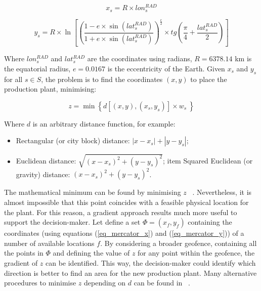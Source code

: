 \begin{equation}
    x_s=R\times lon_s^{RAD}
    \label{eq_mercator_x}
\end{equation}

\begin{equation}
    y_s=R\times\ln{\left[\left(\frac{1-e\times\sin{\left(lat_s^{RAD}\right)}}{1+e\times\sin{\left(lat_s^{RAD}\right)}}\right)^\frac{e}{2}\times t g\left(\frac{\pi}{4}+\frac{lat_s^{RAD}}{2}\right)\right]}
    \label{eq_mercator_y}
\end{equation}

Where $lon_s^{RAD}$ and $lat_s^{RAD}$ are the coordinates using radians, $R=6378.14$ km is the equatorial radius, $e=0.0167$ is the eccentricity of the Earth. Given $x_s$ and $y_s$ for all $s\in S$, the problem is to find the coordinates $(x,y)$ to place the production plant, minimising:

\begin{equation}
    z=\min{\left\{d\left[\left(x,y\right),\left(x_s,y_s\right)\right]\times w_s\ \right\}}
\end{equation}

Where $d$ is an arbitrary distance function, for example:

\begin{itemize}
    \item Rectangular (or city block) distance: $\left|x-x_s\right|+\left|y-y_s\right|$;
	\item Euclidean distance: $\sqrt{\left(x-x_s\right)^2+\left(y-y_s\right)^2}$;
	item Squared Euclidean (or gravity) distance: $\left(x-x_s\right)^2+\left(y-y_s\right)^2$.

\end{itemize}

The mathematical minimum can be found by minimising $z$ ~\cite{Wesolowsky1972}. Nevertheless, it is almost impossible that this point coincides with a feasible physical location for the plant. For this reason, a gradient approach results much more useful to support the decision-maker. Let define a set $\Phi={(x_f,y_f)}$ containing the coordinates (using equations (\ref{eq_mercator_x}) and (\ref{eq_mercator_y})) of a number of available locations $f$. By considering a broader geofence, containing all the points in $\Phi$ and defining the value of $z$ for any point within the geofence, the gradient of $z$ can be identified. This way, the decision-maker could identify which direction is better to find an area for the new production plant. Many alternative procedures to minimise $z$ depending on $d$ can be found in ~\cite{Salhi1996}.\par

